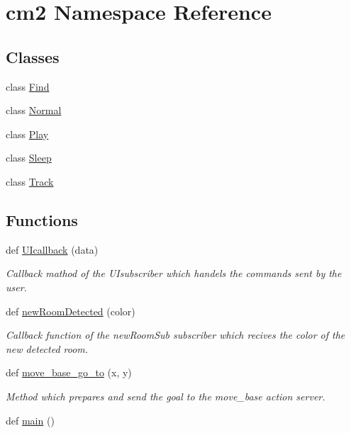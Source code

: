 \hypertarget{namespacecm2}{}\section{cm2 Namespace Reference}
\label{namespacecm2}
\subsection*{Classes}
\begin{DoxyCompactItemize}
\item 
class \hyperlink{classcm2_1_1Find}{Find}
\item 
class \hyperlink{classcm2_1_1Normal}{Normal}
\item 
class \hyperlink{classcm2_1_1Play}{Play}
\item 
class \hyperlink{classcm2_1_1Sleep}{Sleep}
\item 
class \hyperlink{classcm2_1_1Track}{Track}
\end{DoxyCompactItemize}
\subsection*{Functions}
\begin{DoxyCompactItemize}
\item 
def \hyperlink{namespacecm2_a672f12144cc02c256e891ea5924ffffa}{U\+Icallback} (data)
\begin{DoxyCompactList}\small\item\em Callback mathod of the U\+Isubscriber which handels the commands sent by the user. \end{DoxyCompactList}\item 
def \hyperlink{namespacecm2_a4cf77024983dae698861eb6ff2580f39}{new\+Room\+Detected} (color)
\begin{DoxyCompactList}\small\item\em Callback function of the new\+Room\+Sub subscriber which recives the color of the new detected room. \end{DoxyCompactList}\item 
def \hyperlink{namespacecm2_a7249bf198e534c88f2def70c16789cc7}{move\+\_\+base\+\_\+go\+\_\+to} (x, y)
\begin{DoxyCompactList}\small\item\em Method which prepares and send the goal to the move\+\_\+base action server. \end{DoxyCompactList}\item 
def \hyperlink{namespacecm2_a4f33e17e50be167d83eb74879ab4cf76}{main} ()
\end{DoxyCompactItemize}
